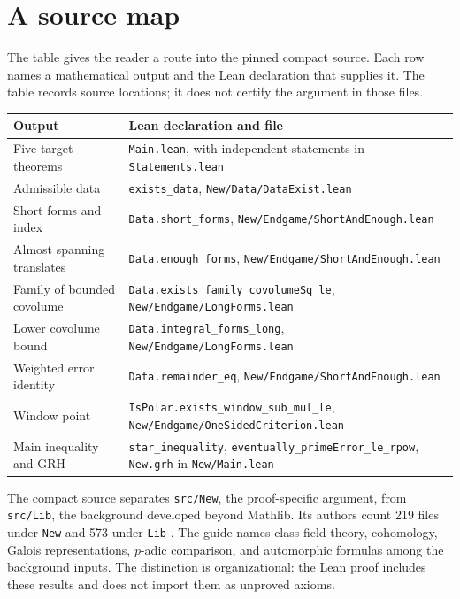 \documentclass[11pt,oneside,openany]{amsbook}
\theoremstyle{remark}
\numberwithin{equation}{section}
\begin{document}
\section{A source map}
The table gives the reader a route into the pinned compact
source. Each row names a mathematical output and the Lean
declaration that supplies it. The table records source
locations; it does not certify the argument in those files.

\begin{longtable}{p{}p{}}
\toprule
Output & Lean declaration and file \\
\midrule
\endhead
Five target theorems & \texttt{Main.lean}, with independent
  statements in \texttt{Statements.lean} \\
Admissible data & \texttt{exists\_data},
  \texttt{New/Data/DataExist.lean} \\
Short forms and index & \texttt{Data.short\_forms},
  \texttt{New/Endgame/ShortAndEnough.lean} \\
Almost spanning translates & \texttt{Data.enough\_forms},
  \texttt{New/Endgame/ShortAndEnough.lean} \\
Family of bounded covolume &
  \texttt{Data.exists\_family\_covolumeSq\_le},
  \texttt{New/Endgame/LongForms.lean} \\
Lower covolume bound & \texttt{Data.integral\_forms\_long},
  \texttt{New/Endgame/LongForms.lean} \\
Weighted error identity & \texttt{Data.remainder\_eq},
  \texttt{New/Endgame/ShortAndEnough.lean} \\
Window point & \texttt{IsPolar.exists\_window\_sub\_mul\_le},
  \texttt{New/Endgame/OneSidedCriterion.lean} \\
Main inequality and GRH & \texttt{star\_inequality},
  \texttt{eventually\_primeError\_le\_rpow},
  \texttt{New.grh} in \texttt{New/Main.lean} \\
\bottomrule
\end{longtable}

The compact source separates \texttt{src/New}, the proof-specific
argument, from \texttt{src/Lib}, the background developed beyond
Mathlib. Its authors count 219 files under \texttt{New} and 573
under \texttt{Lib} \cite[Layout]{Sernau2026}. The guide names
class field theory, cohomology, Galois representations, $p$-adic
comparison, and automorphic formulas among the background inputs.
The distinction is organizational: the Lean proof includes these
results and does not import them as unproved axioms.
\end{document}

